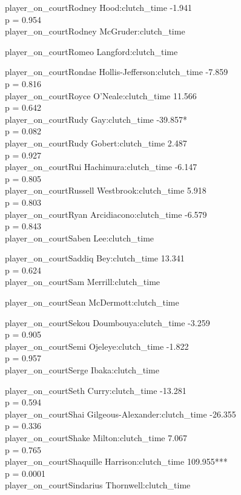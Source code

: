 \documentclass[
  landscape]{article}
\begin{document}
player\_on\_courtRodney Hood:clutch\_time -1.941\\
p = 0.954\\
player\_on\_courtRodney McGruder:clutch\_time

player\_on\_courtRomeo Langford:clutch\_time

player\_on\_courtRondae Hollis-Jefferson:clutch\_time -7.859\\
p = 0.816\\
player\_on\_courtRoyce O'Neale:clutch\_time 11.566\\
p = 0.642\\
player\_on\_courtRudy Gay:clutch\_time -39.857*\\
p = 0.082\\
player\_on\_courtRudy Gobert:clutch\_time 2.487\\
p = 0.927\\
player\_on\_courtRui Hachimura:clutch\_time -6.147\\
p = 0.805\\
player\_on\_courtRussell Westbrook:clutch\_time 5.918\\
p = 0.803\\
player\_on\_courtRyan Arcidiacono:clutch\_time -6.579\\
p = 0.843\\
player\_on\_courtSaben Lee:clutch\_time

player\_on\_courtSaddiq Bey:clutch\_time 13.341\\
p = 0.624\\
player\_on\_courtSam Merrill:clutch\_time

player\_on\_courtSean McDermott:clutch\_time

player\_on\_courtSekou Doumbouya:clutch\_time -3.259\\
p = 0.905\\
player\_on\_courtSemi Ojeleye:clutch\_time -1.822\\
p = 0.957\\
player\_on\_courtSerge Ibaka:clutch\_time

player\_on\_courtSeth Curry:clutch\_time -13.281\\
p = 0.594\\
player\_on\_courtShai Gilgeous-Alexander:clutch\_time -26.355\\
p = 0.336\\
player\_on\_courtShake Milton:clutch\_time 7.067\\
p = 0.765\\
player\_on\_courtShaquille Harrison:clutch\_time 109.955***\\
p = 0.0001\\
player\_on\_courtSindarius Thornwell:clutch\_time
\end{document}
